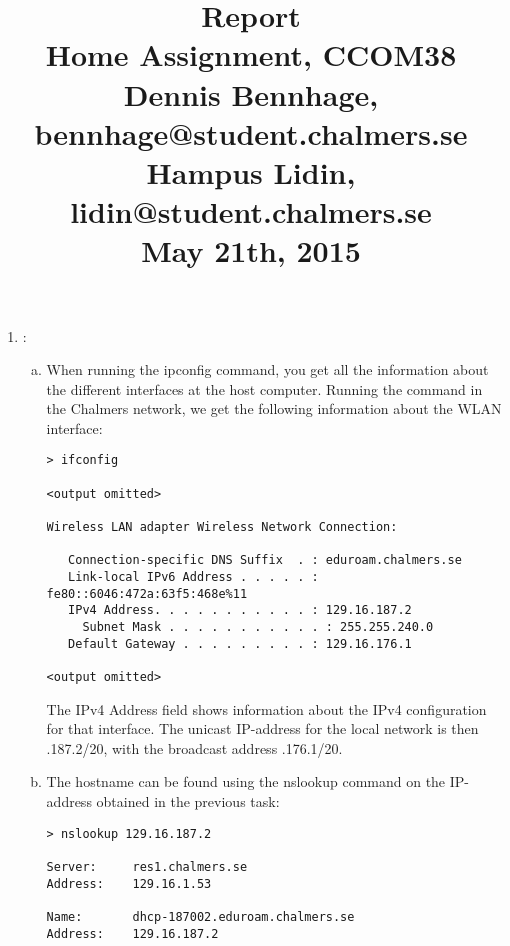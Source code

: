 \documentclass[a4paper,9pt,fleqn]{article}
\title{
{\bf Report}\\
\vspace{0.2cm}
%
Home Assignment, CCOM38\\
\vspace{1cm}
%
{
\large
Dennis Bennhage,	bennhage@student.chalmers.se \\
Hampus Lidin,	lidin@student.chalmers.se
}
\\
\vspace{10cm}
%
May 21th, 2015
}
\date{}
\begin{document}
\maketitle

\newpage

\begin{enumerate}[{Task} 1]
	\item :
	\begin{enumerate}[a)]
		\item 
		When running the {\outp ipconfig} command, you get all the
		information about the different interfaces at the host computer. Running the
		command in the Chalmers network, we get the following information
		about the WLAN interface:
			
\begin{lstlisting}
> ifconfig

<output omitted>

Wireless LAN adapter Wireless Network Connection:

   Connection-specific DNS Suffix  . : eduroam.chalmers.se
   Link-local IPv6 Address . . . . . : fe80::6046:472a:63f5:468e%11
   IPv4 Address. . . . . . . . . . . : 129.16.187.2
	 Subnet Mask . . . . . . . . . . . : 255.255.240.0
   Default Gateway . . . . . . . . . : 129.16.176.1

<output omitted>
\end{lstlisting}

		The {\outp IPv4 Address} field shows information about the IPv4 configuration for that
		interface. The unicast IP-address for the local network is then {.187.2/20},
		with the broadcast address {.176.1/20}. %
    \\
		\item 
		The hostname can be found using the {\outp nslookup} command on the IP-address
		obtained in the previous task:

\begin{lstlisting}
> nslookup 129.16.187.2

Server:		res1.chalmers.se
Address:	129.16.1.53

Name:		dhcp-187002.eduroam.chalmers.se
Address:	129.16.187.2
\end{lstlisting}


\end{enumerate}
\end{enumerate}
\end{document}

